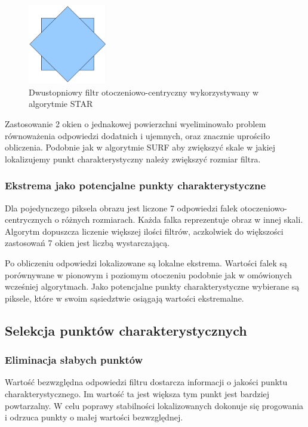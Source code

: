 \begin{figure}
\centering
\includegraphics[height=35mm]{pict/02/star/wg_circle_aprox.png}
\caption{Dwustopniowy filtr otoczeniowo-centryczny wykorzystywany w algorytmie STAR}
\label{fig:wg_circle_aprox}
\end{figure}

Zastosowanie 2 okien o jednakowej powierzchni wyeliminowało problem równoważenia odpowiedzi dodatnich i ujemnych, oraz znacznie uprościło obliczenia. Podobnie jak w algorytmie SURF aby zwiększyć skale w jakiej lokalizujemy punkt charakterystyczny należy zwiększyć rozmiar filtra. 

\subsubsection{Ekstrema jako potencjalne punkty charakterystyczne}

Dla pojedynczego piksela obrazu jest liczone 7 odpowiedzi falek otoczeniowo-centrycznych o różnych rozmiarach. Każda falka reprezentuje obraz w innej skali. Algorytm dopuszcza liczenie większej ilości filtrów, aczkolwiek do większości zastosowań 7 okien jest liczbą wystarczającą.

Po obliczeniu odpowiedzi lokalizowane są lokalne ekstrema. Wartości falek są porównywane w pionowym i poziomym otoczeniu podobnie jak w omówionych wcześniej algorytmach. Jako potencjalne punkty charakterystyczne wybierane są piksele, które w swoim sąsiedztwie osiągają wartości ekstremalne. 

\subsection{Selekcja punktów charakterystycznych}
\subsubsection{Eliminacja słabych punktów}
Wartość bezwzględna odpowiedzi filtru dostarcza informacji o jakości punktu charakterystycznego. Im wartość ta jest większa tym punkt jest bardziej powtarzalny. W celu poprawy stabilności lokalizowanych dokonuje się progowania i odrzuca punkty o małej wartości bezwzględnej.

